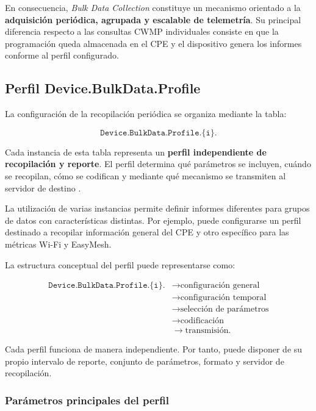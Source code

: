 En consecuencia, \textit{Bulk Data Collection} constituye un mecanismo
orientado a la \textbf{adquisición periódica, agrupada y escalable de
telemetría}. Su principal diferencia respecto a las consultas CWMP
individuales consiste en que la programación queda almacenada en el CPE
y el dispositivo genera los informes conforme al perfil configurado.

\subsection{Perfil Device.BulkData.Profile}
\label{subsec:perfil-device-bulkdata-profile}

La configuración de la recopilación periódica se organiza mediante la
tabla:

\[
    \texttt{Device.BulkData.Profile.\{i\}.}
\]

Cada instancia de esta tabla representa un
\textbf{perfil independiente de recopilación y reporte}. El perfil
determina qué parámetros se incluyen, cuándo se recopilan, cómo se
codifican y mediante qué mecanismo se transmiten al servidor de destino
\cite{bbf_tr181}.

La utilización de varias instancias permite definir informes diferentes
para grupos de datos con características distintas. Por ejemplo, puede
configurarse un perfil destinado a recopilar información general del CPE
y otro específico para las métricas Wi-Fi y EasyMesh.

La estructura conceptual del perfil puede representarse como:

\[
\begin{aligned}
    \texttt{Device.BulkData.Profile.\{i\}.}
    &\longrightarrow
    \text{configuración general}\\
    &\longrightarrow
    \text{configuración temporal}\\
    &\longrightarrow
    \text{selección de parámetros}\\
    &\longrightarrow
    \text{codificación}\\
    &\longrightarrow
    \text{transmisión}.
\end{aligned}
\]

Cada perfil funciona de manera independiente. Por tanto, puede disponer
de su propio intervalo de reporte, conjunto de parámetros, formato y
servidor de recopilación.


\subsubsection*{Parámetros principales del perfil}

